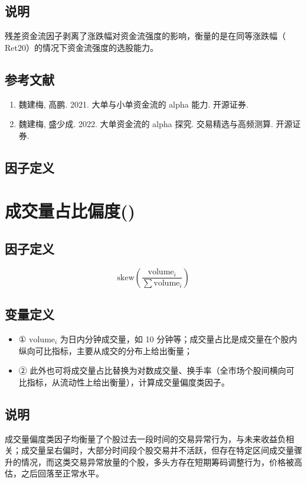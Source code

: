 \documentclass{article}
\begin{document}
\subsection{说明}
残差资金流因子剥离了涨跌幅对资金流强度的影响，衡量的是在同等涨跌幅（\(\mathrm{Ret20}\)）的情况下资金流强度的选股能力。

\subsection{参考文献}
\begin{enumerate}
    \item 魏建梅, 高鹏. 2021. 大单与小单资金流的 alpha 能力. 开源证券.
    \item 魏建梅, 盛少成. 2022. 大单资金流的 alpha 探究. 交易精选与高频测算. 开源证券.
\end{enumerate}

\subsection{因子定义}
\section{成交量占比偏度()}

\subsection{因子定义}
\begin{equation}
    \mathrm{skew}\left(\frac{\mathrm{volume}_i}{\sum \mathrm{volume}_i}\right)
\end{equation}

\subsection{变量定义}
\begin{itemize}
    \item ① \( \mathrm{volume}_i \) 为日内分钟成交量，如 10 分钟等；成交量占比是成交量在个股内纵向可比指标，主要从成交的分布上给出衡量；
    \item ② 此外也可将成交量占比替换为对数成交量、换手率（全市场个股间横向可比指标，从流动性上给出衡量），计算成交量偏度类因子。
\end{itemize}

\subsection{说明}
成交量偏度类因子均衡量了个股过去一段时间的交易异常行为，与未来收益负相关；成交量呈右偏时，大部分时间段个股交易并不活跃，但存在特定区间成交量骤升的情况，而这类交易异常放量的个股，多头方存在短期筹码调整行为，价格被高估，之后回落至正常水平。
\end{document}
